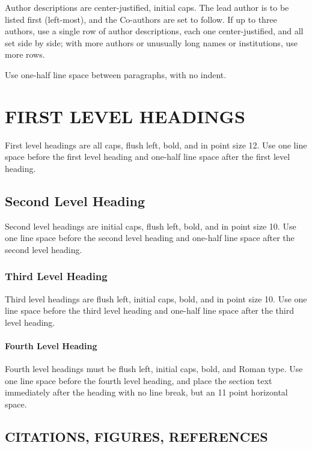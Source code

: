 \documentclass[twoside]{article}
\begin{document}
Author descriptions are center-justified, initial caps.  The lead
author is to be listed first (left-most), and the Co-authors are set
to follow.  If up to three authors, use a single row of author
descriptions, each one center-justified, and all set side by side;
with more authors or unusually long names or institutions, use more
rows.

Use one-half line space between paragraphs, with no indent.

\section{FIRST LEVEL HEADINGS}

First level headings are all caps, flush left, bold, and in point size
12. Use one line space before the first level heading and one-half line space
after the first level heading.

\subsection{Second Level Heading}

Second level headings are initial caps, flush left, bold, and in point
size 10. Use one line space before the second level heading and one-half line
space after the second level heading.

\subsubsection{Third Level Heading}

Third level headings are flush left, initial caps, bold, and in point
size 10. Use one line space before the third level heading and one-half line
space after the third level heading.

\paragraph{Fourth Level Heading}

Fourth level headings must be flush left, initial caps, bold, and
Roman type.  Use one line space before the fourth level heading, and
place the section text immediately after the heading with no line
break, but an 11 point horizontal space.

\subsection{CITATIONS, FIGURES, REFERENCES}
\end{document}
